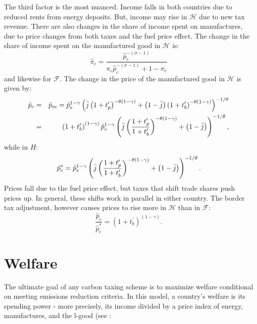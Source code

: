 \documentclass[notitlepage,12pt]{article}
\begin{document}
The third factor is the most nuanced. Income falls in both countries due to
reduced rents from energy deposits. But, income may rise in $\mathcal{H}$
due to new tax revenue. There are also changes in the share of income spent
on manufactures, due to price changes from both taxes and the fuel price
effect. The change in the share of income spent on the manufactured good in $%
\mathcal{H}$ is:%
\begin{equation*}
\hat{\pi}_{c}=\frac{\hat{p}_{c}^{-\left( \sigma -1\right) }}{\pi _{c}\hat{p}%
_{c}^{-\left( \sigma -1\right) }+1-\pi _{c}}
\end{equation*}%
and likewise for $\mathcal{F}$. The change in the price of the manufactured
good in $\mathcal{H}$ is given by:%
\begin{eqnarray*}
\hat{p}_{c} &=&\hat{p}_{m}=\hat{p}_{e}^{1-\gamma }\left( \bar{j}\left(
1+t_{p}^{\prime }\right) ^{-\theta \left( 1-\gamma \right) }+\left( 1-\bar{j}%
\right) \left( 1+t_{b}^{\prime }\right) ^{-\theta \left( 1-\gamma \right)
}\right) ^{-1/\theta } \\
&=&\left( 1+t_{b}^{\prime }\right) ^{\left( 1-\gamma \right) }\hat{p}%
_{e}^{1-\gamma }\left( \bar{j}\left( \frac{1+t_{p}^{\prime }}{%
1+t_{b}^{\prime }}\right) ^{-\theta \left( 1-\gamma \right) }+\left( 1-\bar{j%
}\right) \right) ^{-1/\theta },
\end{eqnarray*}%
while in $H$:%
\begin{equation*}
\hat{p}_{c}^{\ast }=\hat{p}_{e}^{1-\gamma }\left( \bar{j}\left( \frac{%
1+t_{p}^{\prime }}{1+t_{b}^{\prime }}\right) ^{-\theta \left( 1-\gamma
\right) }+\left( 1-\bar{j}\right) \right) ^{-1/\theta }.
\end{equation*}%
Prices fall due to the fuel price effect, but taxes that shift trade shares
push prices up. In general, these shifts work in parallel in either country.
The border tax adjustment, however causes prices to rise more in $\mathcal{H}
$ than in $\mathcal{F}$:%
\begin{equation*}
\frac{\hat{p}_{c}}{\hat{p}_{c}^{\ast }}=\left( 1+t_{b}^{\prime }\right)
^{\left( 1-\gamma \right) }.
\end{equation*}

\section{Welfare}

The ultimate goal of any carbon taxing scheme is to maximize welfare conditional on meeting emissions reduction criteria. In this model, a country's welfare is its spending power - more precisely, its income divided by a price index of energy, manufactures, and the l-good (see :
\end{document}
